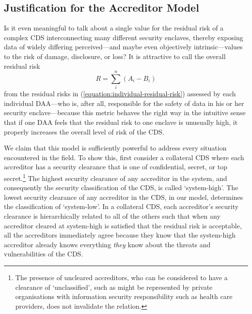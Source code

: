 \documentclass{llncs}
\begin{document}
\subsection{Justification for the Accreditor Model}

Is it even meaningful to talk about a single value for the residual risk
of a complex CDS interconnecting many different security enclaves, thereby
exposing data of widely differing perceived---and maybe even objectively
intrinsic---values to the risk of damage, disclosure, or loss?  It is
attractive to call the overall residual risk
\begin{equation}\label{equation:residual-risk}
R = \sum_i^n \left(A_i - B_i\right)
\end{equation}
from the residual risks in (\ref{equation:individual-residual-risk}) assessed
by each individual DAA---who is, after all, responsible
for the safety of data in his or her security enclave---because this metric behaves
the right way in the intuitive sense that if one DAA feels that the residual
risk to one enclave is unusually high, it properly increases the overall
level of risk of the CDS.

We claim that this model is sufficiently powerful to address every situation
encountered in the field.  To show this, first consider a collateral CDS
where each accreditor has a security clearance that is one of confidential,
secret, or top secret.\footnote{The presence of uncleared accreditors, who can
be considered to have a clearance of `unclassified', such as might be represented
by private organisations with information security responsibility such as health
care providers, does not invalidate the relation.}  The highest security
clearance of any accreditor in the system, and consequently the security
classification of the CDS, is called `system-high'. The lowest security clearance
of any accreditor in the CDS, in our model, determines the classification of `system-low'.
In a collateral CDS, each accreditor's security clearance is hierarchically related
to all of the others such that when any accreditor cleared at system-high is satisfied
that the residual risk is acceptable, all the accreditors immediately agree because
they know that the system-high accreditor already knows everything \emph{they} know
about the threats and vulnerabilities of the CDS.
\end{document}
